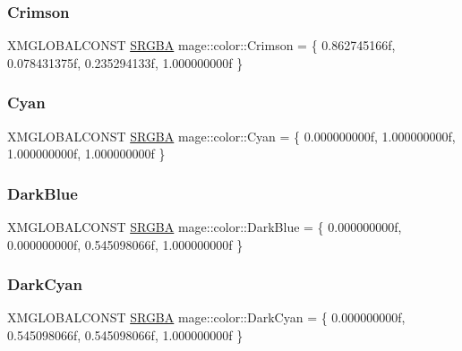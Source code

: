 \hypertarget{namespacemage_1_1color_abc19ee500228a105fe49c5ca24cfe98e}{}\label{namespacemage_1_1color_abc19ee500228a105fe49c5ca24cfe98e} 
\subsubsection{\texorpdfstring{Crimson}{Crimson}}
{\footnotesize\ttfamily X\+M\+G\+L\+O\+B\+A\+L\+C\+O\+N\+ST \hyperlink{structmage_1_1_s_r_g_b_a}{S\+R\+G\+BA} mage\+::color\+::\+Crimson = \{ 0.\+862745166f, 0.\+078431375f, 0.\+235294133f, 1.\+000000000f \}}

\hypertarget{namespacemage_1_1color_a56474d8e830aab2eaca9bcb8a14a7754}{}\label{namespacemage_1_1color_a56474d8e830aab2eaca9bcb8a14a7754} 
\subsubsection{\texorpdfstring{Cyan}{Cyan}}
{\footnotesize\ttfamily X\+M\+G\+L\+O\+B\+A\+L\+C\+O\+N\+ST \hyperlink{structmage_1_1_s_r_g_b_a}{S\+R\+G\+BA} mage\+::color\+::\+Cyan = \{ 0.\+000000000f, 1.\+000000000f, 1.\+000000000f, 1.\+000000000f \}}

\hypertarget{namespacemage_1_1color_a54cb89c27cd5fe8934aa1b49ee79ea3b}{}\label{namespacemage_1_1color_a54cb89c27cd5fe8934aa1b49ee79ea3b} 
\subsubsection{\texorpdfstring{Dark\+Blue}{DarkBlue}}
{\footnotesize\ttfamily X\+M\+G\+L\+O\+B\+A\+L\+C\+O\+N\+ST \hyperlink{structmage_1_1_s_r_g_b_a}{S\+R\+G\+BA} mage\+::color\+::\+Dark\+Blue = \{ 0.\+000000000f, 0.\+000000000f, 0.\+545098066f, 1.\+000000000f \}}

\hypertarget{namespacemage_1_1color_ac0be520fcdc0da71755c6f202d763b4f}{}\label{namespacemage_1_1color_ac0be520fcdc0da71755c6f202d763b4f} 
\subsubsection{\texorpdfstring{Dark\+Cyan}{DarkCyan}}
{\footnotesize\ttfamily X\+M\+G\+L\+O\+B\+A\+L\+C\+O\+N\+ST \hyperlink{structmage_1_1_s_r_g_b_a}{S\+R\+G\+BA} mage\+::color\+::\+Dark\+Cyan = \{ 0.\+000000000f, 0.\+545098066f, 0.\+545098066f, 1.\+000000000f \}}

